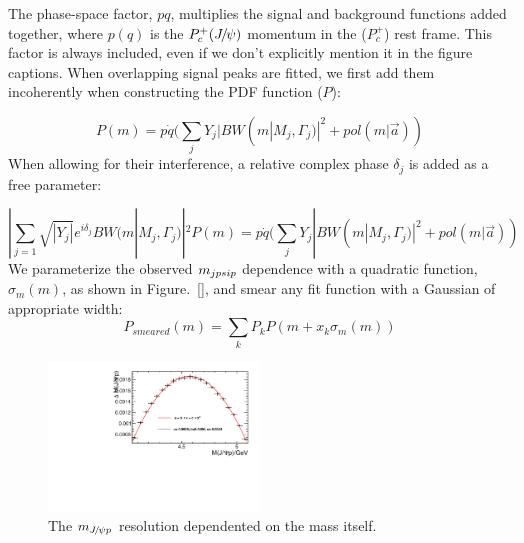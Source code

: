 The phase-space factor, $pq$, 
multiplies the signal and background functions added together, 
where $p(q)$ is the $P_c^+({{J\mskip -3mu/\mskip -2mu\psi}})$ momentum in the \Lb ($P_c^+$) rest frame. 
This factor is always included, 
even if we don’t explicitly mention it in the figure captions.
When overlapping signal peaks are fitted, 
we first add them incoherently when constructing the PDF function ($P$):

\begin{equation}
	P(m) = p \dot q ( \sum_{j} Y_{j} |BW(m|M_j,\Gamma_j)|^2 + pol(m|\vec{a}))
\end{equation}
When allowing for their interference, 
a relative complex phase $\delta_j$ is added as a free parameter:

\begin{equation}
	| \sum_{j=1} \sqrt{|Y_j|} e^{i\delta_j} BW(m|M_j,\Gamma_j) |^2
	P(m) = p \dot q ( \sum_{j} Y_{j} |BW(m|M_j,\Gamma_j)|^2 + pol(m|\vec{a}))
\end{equation}
We parameterize the observed $m_{jpsi{p}}$ dependence with a quadratic function, $\sigma_m(m)$, 
as shown in Figure.~\ref{}, 
and smear any fit function with a Gaussian of appropriate width:
\begin{equation}
   P_{smeared}(m) = \sum_{k} P_{k} P(m+x_{k}\sigma_{m}(m))
\end{equation}

\begin{figure}[!hbtp]
\centering
\includegraphics[width=0.5\textwidth]{Figures/08_JpsipK/plot_mass_res/run2}%
   \caption{The $m_{{{J\mskip -3mu/\mskip -2mu\psi}}{p}}$ resolution dependented on the mass itself.}
\label{fig:Mass_res_jpsip}
\end{figure}










